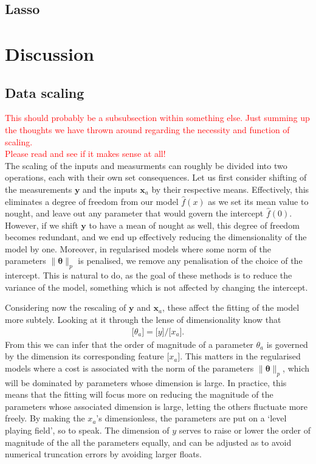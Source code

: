 \documentclass[twocolumn,english,notitlepage]{article}
\newcommand{\comment}[1]{\textcolor{red}{#1}\\}
\renewcommand{\vec}[1]{\boldsymbol{#1}}
\renewcommand{\norm}[2][]{\ensuremath{\|#2\|_{#1}}}
\newcommand{\dimof}[1]{\bigl[#1\bigr]}
\begin{document}
    \subsection{Lasso}
    
\section{Discussion}
    \subsection{Data scaling}
        \comment{This should probably be a subsubsection within something else. Just summing up the thoughts we have thrown around regarding the necessity and function of scaling.}
        \comment{Please read and see if it makes sense at all!}
        The scaling of the inputs and measurments can roughly be divided into two operations, each with their own set consequences. Let us first consider shifting of the measurements $\vec{y}$ and the inputs $\vec{x}_a$ by their respective means. Effectively, this eliminates a degree of freedom from our model $\hat{f}(x)$ as we set its mean value to nought, and leave out any parameter that would govern the intercept $\hat{f}(0)$. However, if we shift $\vec{y}$ to have a mean of nought as well, this degree of freedom becomes redundant, and we end up effectively reducing the dimensionality of the model by one. Moreover, in regularised models where some norm of the parameters $\norm[p]{\vec{\theta}}$ is penalised, we remove any penalisation of the choice of the intercept. This is natural to do, as the goal of these methods is to reduce the variance of the model, something which is not affected by changing the intercept.

        Considering now the rescaling of $\vec{y}$ and $\vec{x}_a$, these affect the fitting of the model more subtely. Looking at it through the lense of dimensionality know that
        \begin{align}
            \dimof{\theta_a} = \dimof{y} / \dimof{x_a}.
        \end{align}
        From this we can infer that the order of magnitude of a parameter $\theta_a$ is governed by the dimension its corresponding feature $\dimof{x_a}$. This matters in the regularised models where a cost is associated with the norm of the parameters $\norm[p]{\vec{\theta}}$, which will be dominated by parameters whose dimension is large. In practice, this means that the fitting will focus more on reducing the magnitude of the parameters whose associated dimension is large, letting the others fluctuate more freely. By making the $x_a$'s dimensionless, the parameters are put on a `level playing field', so to speak. The dimension of $y$ serves to raise or lower the order of magnitude of the all the parameters equally, and can be adjusted as to avoid numerical truncation errors by avoiding larger floats.
\end{document}
